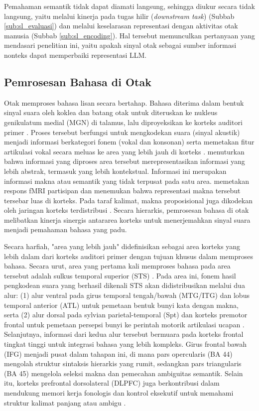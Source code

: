 Pemahaman semantik tidak dapat diamati langsung, sehingga diukur secara tidak langsung, yaitu melalui kinerja pada tugas hilir (\textit{downstream task}) (Subbab \ref{sub:sl_evaluasi}) dan melalui keselarasan representasi dengan aktivitas otak manusia (Subbab \ref{sub:sl_encoding}). Hal tersebut memunculkan pertanyaan yang mendasari penelitian ini, yaitu apakah sinyal otak sebagai sumber informasi nonteks dapat memperbaiki representasi LLM.

\subsection{Pemrosesan Bahasa di Otak}
\label{sub:sl_otak}

Otak memproses bahasa lisan secara bertahap. Bahasa diterima dalam bentuk sinyal suara oleh koklea dan batang otak untuk diteruskan ke nukleus genikulatum medial (MGN) di talamus, lalu diproyeksikan ke korteks auditori primer \autocite{hamilton2021parallel}. 
Proses tersebut berfungsi untuk mengkodekan suara (sinyal akustik) menjadi informasi berkategori fonem (vokal dan konsonan) serta memetakan fitur artikulasi vokal secara meluas ke area yang lebih jauh di korteks \autocite{deheer2017hierarchical}. \textcite{mischler2024contextual} menuturkan bahwa informasi yang diproses area tersebut merepresentasikan informasi yang lebih abstrak, termasuk yang lebih kontekstual. Informasi ini merupakan informasi makna atau semantik yang tidak terpusat pada satu area. \textcite{huth2016natural} memetakan respons fMRI partisipan dan menemukan bahwa representasi makna tersebut tersebar luas di korteks. Pada taraf kalimat, makna proposisional juga dikodekan oleh jaringan korteks terdistribusi \autocite{anderson2021deep}. Secara hierarkis, pemrosesan bahasa di otak melibatkan kinerja sinergis antararea korteks untuk menerjemahkan sinyal suara menjadi pemahaman bahasa yang padu. 

Secara harfiah, "area yang lebih jauh" didefinisikan sebagai area korteks yang lebih dalam dari korteks auditori primer dengan tujuan khusus dalam memproses bahasa. Secara urut, area yang pertama kali memproses bahasa pada area tersebut adalah sulkus temporal superior (STS) \autocite{deheer2017hierarchical}. Pada area ini, fonem hasil pengkodean suara yang berhasil dikenali STS akan didistribusikan melalui dua alur: (1) alur ventral pada girus temporal tengah/bawah (MTG/ITG) dan lobus temporal anterior (ATL) untuk pemetaan bentuk bunyi kata dengan makna, serta (2) alur dorsal pada sylvian parietal-temporal (Spt) dan korteks premotor frontal untuk pemetaan persepsi bunyi ke perintah motorik artikulasi ucapan \autocite{saur2008langpathways}. Selanjutnya, informasi dari kedua alur tersebut bermuara pada korteks frontal tingkat tinggi untuk integrasi bahasa yang lebih kompleks. Girus frontal bawah (IFG) menjadi pusat dalam tahapan ini, di mana pars opercularis (BA 44) mengolah struktur sintaksis hierarkis yang rumit, sedangkan pars triangularis (BA 45) mengelola seleksi makna dan pemecahan ambiguitas semantik. Selain itu, korteks prefrontal dorsolateral (DLPFC) juga berkontribusi dalam mendukung memori kerja fonologis dan kontrol eksekutif untuk memahami struktur kalimat panjang atau ambigu \autocite{friederici2011brain}.

